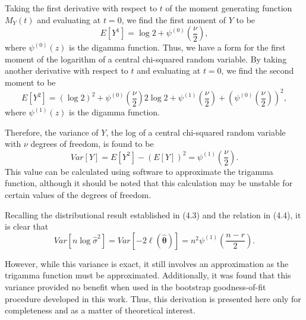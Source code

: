\documentclass[submit]{smj}
\begin{document}
Taking the first derivative with respect to $t$ of the moment generating function $M_Y (t)$ and evaluating at $t=0$, we find the first moment of $Y$ to be
\begin{equation*}
	E \left[ Y^1 \right] =  \log 2 + \psi^{(0)} \left( \frac{\nu}{2} \right) ,
\end{equation*}
where $\psi^{(0)}(z)$ is the digamma function. Thus, we have a form for the first moment of the logarithm of a central chi-squared random variable. By taking another
derivative with respect to $t$ and evaluating at $t=0$, we find the second moment to be
\begin{equation*}
	E \left[ Y^2 \right] =
	(\log 2)^2 + \psi^{(0)} \left( \frac{\nu}{2} \right) 2 \log 2  + \psi^{(1)} \left( \frac{\nu}{2} \right) + \left( \psi^{(0)} \left( \frac{\nu}{2} \right) \right)^2 ,
\end{equation*}
where $\psi^{(1)}(z)$ is the digamma function.

Therefore, the variance of $Y$, the log of a central chi-squared random variable with
$\nu$ degrees of freedom, is found to be
\begin{equation*}
	Var \left[ Y \right] = E \left[ Y^2 \right] - \left( E \left[ Y \right] \right)^2 = \psi^{(1)} \left( \frac{\nu}{2} \right) .
\end{equation*}
This value can be calculated using software to approximate the trigamma function, although it should be noted that this calculation may be unstable for certain values of the degrees of freedom.

Recalling the distributional result established in (4.3) and the relation in (4.4), it is clear that
\begin{equation*}
	Var \left[ n \log \hat{\sigma}^2 \right] = Var \left[ -2 \ell (\hat{\bm{\theta}} ) \right] = n^2 \psi^{(1)} \left( \frac{n-r}{2} \right).
\end{equation*}

However, while this variance is exact, it still involves an approximation as the trigamma function must be approximated. Additionally, it was found that
this variance provided no benefit when used in the bootstrap goodness-of-fit procedure developed in this work. Thus, this derivation is presented here only
for completeness and as a matter of theoretical interest.


\end{document}
